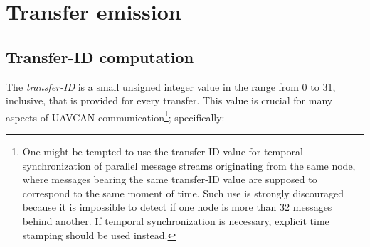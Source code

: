 \section{Transfer emission}

\subsection{Transfer-ID computation}\label{sec:transfer_id}

The \emph{transfer-ID} is a small unsigned integer value in the range from 0 to 31, inclusive,
that is provided for every transfer.
This value is crucial for many aspects of UAVCAN communication\footnote{One might be tempted to use the transfer-ID
value for temporal synchronization of parallel message streams originating from the same node,
where messages bearing the same transfer-ID value are supposed to correspond to the same moment of time.
Such use is strongly discouraged because it is impossible to detect if one node is more than
32 messages behind another.
If temporal synchronization is necessary, explicit time stamping should be used instead.};
specifically:
